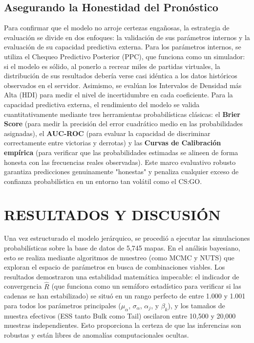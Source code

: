 \documentclass[twocolumn,10pt]{article}
\begin{document}
\subsection{Asegurando la Honestidad del Pronóstico}
Para confirmar que el modelo no arroje certezas engañosas, la estrategia de evaluación se divide en dos enfoques: la validación de sus parámetros internos y la evaluación de su capacidad predictiva externa. Para los parámetros internos, se utiliza el Chequeo Predictivo Posterior (PPC), que funciona como un simulador: si el modelo es sólido, al ponerlo a recrear miles de partidas virtuales, la distribución de sus resultados debería verse casi idéntica a los datos históricos observados en el servidor. Asimismo, se evalúan los Intervalos de Densidad más Alta (HDI) para medir el nivel de incertidumbre en cada coeficiente. Para la capacidad predictiva externa, el rendimiento del modelo se valida cuantitativamente mediante tres herramientas probabilísticas clásicas: el \textbf{Brier Score} (para medir la precisión del error cuadrático medio en las probabilidades asignadas), el \textbf{AUC-ROC} (para evaluar la capacidad de discriminar correctamente entre victorias y derrotas) y las \textbf{Curvas de Calibración empírica} (para verificar que las probabilidades estimadas se alineen de forma honesta con las frecuencias reales observadas). Este marco evaluativo robusto garantiza predicciones genuinamente "honestas" y penaliza cualquier exceso de confianza probabilística en un entorno tan volátil como el CS:GO.

\section{RESULTADOS Y DISCUSIÓN}

Una vez estructurado el modelo jerárquico, se procedió a ejecutar las simulaciones probabilísticas sobre la base de datos de 5,745 mapas. En el análisis bayesiano, esto se realiza mediante algoritmos de muestreo (como MCMC y NUTS) que exploran el espacio de parámetros en busca de combinaciones viables. Los resultados demostraron una estabilidad matemática impecable: el indicador de convergencia $\hat{R}$ (que funciona como un semáforo estadístico para verificar si las cadenas se han estabilizado) se situó en un rango perfecto de entre 1.000 y 1.001 para todos los parámetros principales ($\mu_\alpha$, $\sigma_\alpha$, $\alpha_j$, y $\beta_k$), y los tamaños de muestra efectivos (ESS tanto Bulk como Tail) oscilaron entre 10,500 y 20,000 muestras independientes. Esto proporciona la certeza de que las inferencias son robustas y están libres de anomalías computacionales ocultas.
\end{document}
